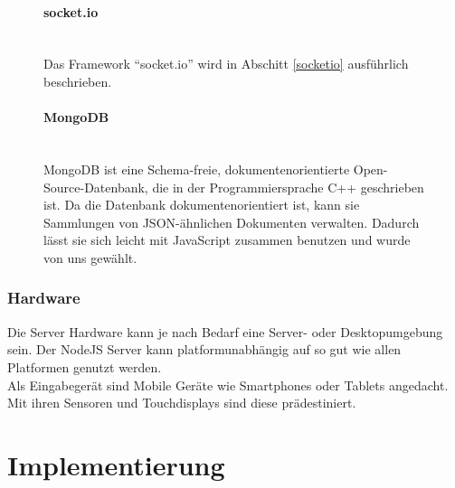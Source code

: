 \documentclass[a4paper]{spie}  %
\begin{document}
\begin{figure}[H]
\begin{minipage}[t]{0.4\textwidth}
\vspace{0pt}
\paragraph{socket.io}\mbox{}\\
Das Framework \enquote{socket.io} wird in Abschitt \ref{socketio} ausführlich beschrieben.
\end{minipage}
\hfill
\begin{minipage}[t]{0.5\textwidth}
\vspace{0pt}
\paragraph{MongoDB}\mbox{}\\
MongoDB ist eine Schema-freie, dokumentenorientierte Open-Source-Datenbank, die in der Programmiersprache C++ geschrieben ist. Da die Datenbank dokumentenorientiert ist, kann sie Sammlungen von JSON-ähnlichen Dokumenten verwalten. Dadurch lässt sie sich leicht mit JavaScript zusammen benutzen und wurde von uns gewählt.
\end{minipage}
\end{figure}


\subsubsection{Hardware}
Die Server Hardware kann je nach Bedarf eine Server- oder Desktopumgebung sein. Der NodeJS Server kann platformunabhängig auf so gut wie allen Platformen genutzt werden.\\
Als Eingabegerät sind Mobile Geräte wie Smartphones oder Tablets angedacht. Mit ihren Sensoren und Touchdisplays sind diese prädestiniert.
%
%

\section{Implementierung}
\end{document}
